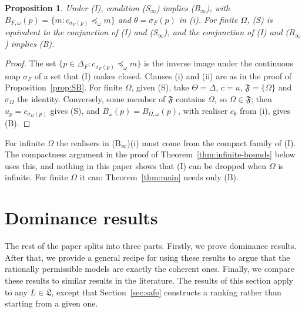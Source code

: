 \documentclass[11pt]{article}
\newtheorem{proposition}[theorem]{Proposition}
\theoremstyle{definition}
\theoremstyle{remark}
\newcommand{\F}{\mathfrak F}
\begin{document}
\begin{proposition}\label{prop:SBinfty}
Under (I), condition (S$_\infty$) implies (B$_\infty$), with $B_{F,\omega}(p)=\{m:c_{\sigma_F(p)}\preceq_\omega m\}$ and $\theta=\sigma_F(p)$ in (i). For finite $\Omega$, (S) is equivalent to the conjunction of (I) and (S$_\infty$), and the conjunction of (I) and (B$_\infty$) implies (B).
\end{proposition}
\begin{proof}
The set $\{p\in\Delta_F:c_{\sigma_F(p)}\preceq_\omega m\}$ is the inverse image under the continuous map $\sigma_F$ of a set that (I) makes closed. Clauses (i) and (ii) are as in the proof of Proposition~\ref{prop:SB}. For finite $\Omega$, given (S), take $\Theta=\Delta$, $c=u$, $\F=\{\Omega\}$ and $\sigma_\Omega$ the identity. Conversely, some member of $\F$ contains $\Omega$, so $\Omega\in\F$; then $u_p=c_{\sigma_\Omega(p)}$ gives (S), and $B_\omega(p)=B_{\Omega,\omega}(p)$, with realiser $c_\theta$ from (i), gives (B).
\end{proof}
For infinite $\Omega$ the realisers in (B$_\infty$)(i) must come from the compact family of (I). The compactness argument in the proof of Theorem~\ref{thm:infinite-bounds} below uses this, and nothing in this paper shows that (I) can be dropped when $\Omega$ is infinite. For finite $\Omega$ it can: Theorem~\ref{thm:main} needs only (B).

\section{Dominance results}\label{sec:results}
The rest of the paper splits into three parts. Firstly, we prove dominance results. After that, we provide a general recipe for using these results to argue that the rationally permissible models are exactly the coherent ones. Finally, we compare these results to similar results in the literature. The results of this section apply to any $L\in\mathfrak L$, except that Section~\ref{sec:safe} constructs a ranking rather than starting from a given one.
\end{document}
